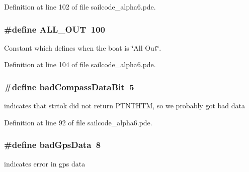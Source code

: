 \-Definition at line 102 of file sailcode\-\_\-alpha6.\-pde.

\hypertarget{group__globalconstants_ga074485974be5a03e711020873d83fd90}{
\subsubsection[{\-A\-L\-L\-\_\-\-O\-U\-T}]{\setlength{\rightskip}{0pt plus 5cm}\#define \-A\-L\-L\-\_\-\-O\-U\-T~100}}
\label{group__globalconstants_ga074485974be5a03e711020873d83fd90}


\-Constant which defines when the boat is \char`\"{}\-All Out\char`\"{}. 



\-Definition at line 104 of file sailcode\-\_\-alpha6.\-pde.

\hypertarget{group__globalconstants_ga69c4923d7bb43a1880f9fbb878bed927}{
\subsubsection[{bad\-Compass\-Data\-Bit}]{\setlength{\rightskip}{0pt plus 5cm}\#define bad\-Compass\-Data\-Bit~5}}
\label{group__globalconstants_ga69c4923d7bb43a1880f9fbb878bed927}


indicates that strtok did not return \-P\-T\-N\-T\-H\-T\-M, so we probably got bad data 



\-Definition at line 92 of file sailcode\-\_\-alpha6.\-pde.

\hypertarget{group__globalconstants_ga5219c41d9ae91432ffb55ec7aeef8873}{
\subsubsection[{bad\-Gps\-Data}]{\setlength{\rightskip}{0pt plus 5cm}\#define bad\-Gps\-Data~8}}
\label{group__globalconstants_ga5219c41d9ae91432ffb55ec7aeef8873}


indicates error in gps data 



